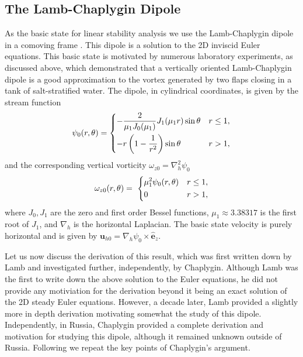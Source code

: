 \subsection{The Lamb-Chaplygin Dipole} 
As the basic state for linear stability analysis we use the Lamb-Chaplygin dipole in a comoving frame \cite{meleshko1994}. This dipole is a solution to the 2D inviscid Euler equations. This basic state is motivated by numerous laboratory experiments\cite{bc2000a,leweke1998}, as discussed above, which demonstrated that a vertically oriented Lamb-Chaplygin dipole is a good approximation to the vortex generated by two flaps closing in a tank of salt-stratified water. The dipole, in cylindrical coordinates, is given by the stream function
\begin{align}
\psi_{0}(r,\theta) = 
\begin{dcases}
-\frac{2}{\mu_{1}J_{0}(\mu_{1})}J_{1}(\mu_{1}r)\sin\theta & r\le 1,\\\label{lc_dipole_sf}
-r\left(1-\frac{1}{r^{2}}\right)\sin\theta & r>1 ,
\end{dcases}
\end{align}
and the corresponding vertical vorticity $\omega_{z0}=\nabla_{h}^{2}\psi_{0}$
\begin{align}
\omega_{z0}(r,\theta) = \
\begin{dcases}
\mu_{1}^{2}\psi_{0}(r,\theta) & r\le 1,\\
0 & r>1,
\end{dcases}
\end{align}
where $J_{0},J_{1}$ are the zero and first order Bessel functions, $\mu_{1}\approx 3.38317$ is the first root of $J_{1}$, and $\nabla_{h}$ is the horizontal Laplacian. The basic state velocity is purely horizontal and is given by $\bm{u}_{h0}=\nabla_{h}\psi_{0}\times\hat{\bm{e}}_{z}$.

Let us now discuss the derivation of this result, which was first written down by Lamb and investigated further, independently, by Chaplygin. Although Lamb was the first to write down the above solution to the Euler equations, he did not provide any motiviation for the derivation beyond it being an exact solution of the 2D steady Euler equations. However, a decade later, Lamb provided a slightly more in depth derivation motivating somewhat the study of this dipole. Independently, in Russia, Chaplygin provided a complete derivation and motivation for studying this dipole, although it remained unknown outside of Russia. Following \cite{meleshko1994} we repeat the key points of Chaplygin's argument. 

